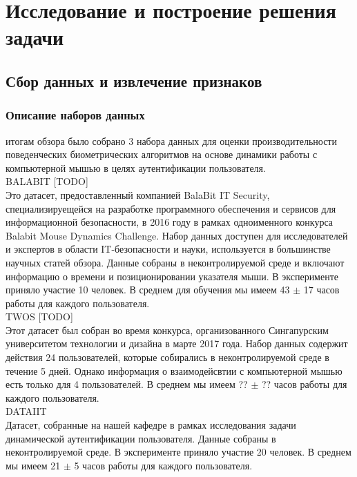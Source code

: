 \documentclass[12pt]{article}
\begin{document}
    \newpage



    \section{Исследование и построение решения задачи}
    \label{sec:Research}
    
    \subsection{Сбор данных и извлечение признаков}
    \label{sec:Research:Data}

    \subsubsection{Описание наборов данных}
    \label{sec:Research:Data:Description}

     итогам обзора было собрано 3 набора данных для оценки производительности поведенческих биометрических алгоритмов на основе динамики работы с компьютерной мышью в целях аутентификации пользователя. \\
    
    \noindent\textsc{BALABIT} [TODO] \\
    Это датасет, предоставленный компанией BalaBit IT Security, специализируещейся на разработке программного обеспечения и сервисов для информационной безопасности, в 2016 году в рамках одноименного конкурса Balabit Mouse Dynamics Challenge. Набор данных доступен для исследователей и экспертов в области IT-безопасности и науки, используется в большинстве научных статей обзора. Данные собраны в неконтролируемой среде и включают информацию о времени и позиционировании указателя мыши. В эксперименте приняло участие 10 человек. В среднем для обучения мы имеем 43 $\pm$ 17 часов работы для каждого пользователя. \\
    
    \noindent\textsc{TWOS} [TODO] \\
    Этот датасет был собран во время конкурса, организованного Сингапурским университетом технологии и дизайна в марте 2017 года. Набор данных содержит действия 24 пользователей, которые собирались в неконтролируемой среде в течение 5 дней. Однако информация о взаимодейсвтии с компьютерной мышью есть только для 4 пользователей. В среднем мы имеем ?? $\pm$ ?? часов работы для каждого пользователя. \\
    
    \noindent\textsc{DATAIIT} \\
    Датасет, собранные на нашей кафедре в рамках исследования задачи динамической аутентификации пользователя. Данные собраны в неконтролируемой среде. В эксперименте приняло участие 20 человек. В среднем мы имеем 21 $\pm$ 5 часов работы для каждого пользователя. \\
\end{document}
